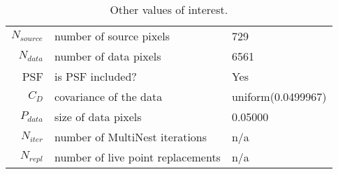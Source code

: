 \begin{table*}[!htb]\caption{Other values of interest.}\begin{center}\begin{tabular}{ r l l }\hline $N_{source}$ & number of source pixels           & 729 \\ 
 $N_{data}$   & number of data pixels             & 6561 \\ 
 PSF & is PSF included?                          & Yes \\
 $C_D$        & covariance of the data            & uniform(0.0499967) \\ 
 $P_{data}$   & size of data pixels               &    0.05000 \\ 
 $N_{iter}$   & number of MultiNest iterations    & n/a \\ 
 $N_{repl}$   & number of live point replacements & n/a \\ 
\hline\end{tabular}\end{center}\label{tab:3}\end{table*}